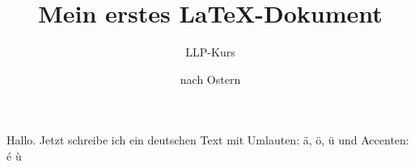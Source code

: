 \documentclass{scrartcl}
\title{Mein erstes \LaTeX-Dokument}
\author{LLP-Kurs}
\date{nach Ostern}
\begin{document}
\maketitle
  Hallo. Jetzt schreibe ich ein deutschen Text mit Umlauten: ä, ö, ü und Accenten: é ù %
\end{document}
